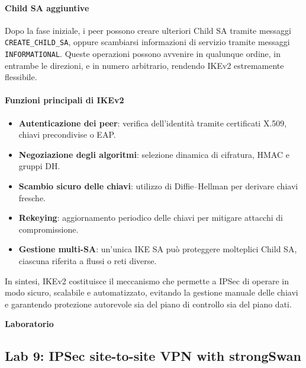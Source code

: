 \paragraph{Child SA aggiuntive}
Dopo la fase iniziale, i peer possono creare ulteriori Child SA tramite messaggi
\texttt{CREATE\_CHILD\_SA}, oppure scambiarsi informazioni di servizio tramite
messaggi \texttt{INFORMATIONAL}.
Queste operazioni possono avvenire in qualunque ordine, in entrambe le direzioni, e in numero
arbitrario, rendendo IKEv2 estremamente flessibile.

\paragraph{Funzioni principali di IKEv2}
\begin{itemize}
    \item \textbf{Autenticazione dei peer}: verifica dell’identità tramite certificati X.509,
          chiavi precondivise o EAP.
    \item \textbf{Negoziazione degli algoritmi}: selezione dinamica di cifratura, HMAC e gruppi DH.
    \item \textbf{Scambio sicuro delle chiavi}: utilizzo di Diffie--Hellman per derivare chiavi fresche.
    \item \textbf{Rekeying}: aggiornamento periodico delle chiavi per mitigare attacchi di compromissione.
    \item \textbf{Gestione multi-SA}: un’unica IKE SA può proteggere molteplici Child SA,
          ciascuna riferita a flussi o reti diverse.
\end{itemize}

In sintesi, IKEv2 costituisce il meccanismo che permette a IPSec di operare in modo sicuro,
scalabile e automatizzato, evitando la gestione manuale delle chiavi e garantendo protezione
autorevole sia del piano di controllo sia del piano dati.





\newpage
\maketitle
{\LARGE \textbf{Laboratorio}} \\[0.5em]
\subsection{Lab 9: IPSec site-to-site VPN with strongSwan}


